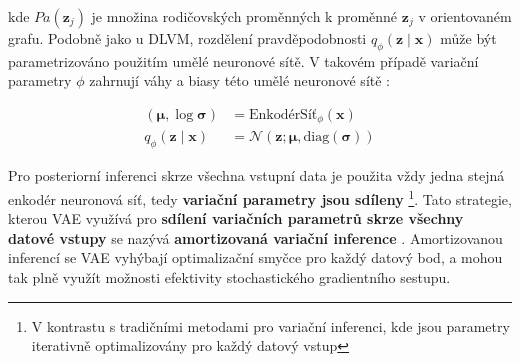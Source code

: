 kde $Pa(\textbf{z}_j)$ je množina rodičovských proměnných k proměnné $\textbf{z}_j$ v orientovaném grafu.
Podobně jako u DLVM, rozdělení pravděpodobnosti $q_\phi(\textbf{z}\mid\textbf{x})$ může být parametrizováno použitím umělé neuronové sítě.
V takovém případě variační parametry $\phi$ zahrnují váhy a biasy této umělé neuronové sítě \cite{Kingma2014}:


\begin{align}
    (\boldsymbol{\mu}, \log \boldsymbol{\sigma}) &= \text{EnkodérSíť}_\phi(\textbf{x}) \\
    q_\phi(\textbf{z}\mid\textbf{x}) &= \mathcal{N}(\textbf{z}; \boldsymbol{\mu}, \text{diag}(\boldsymbol{\sigma})) \label{eq:enkoder_diag}
\end{align}

Pro posteriorní inferenci skrze všechna vstupní data je použita vždy jedna stejná enkodér neuronová síť, tedy \textbf{variační parametry jsou sdíleny}
\footnote{V kontrastu s tradičními metodami pro variační inferenci, kde jsou parametry iterativně optimalizovány pro každý datový vstup}.
Tato strategie, kterou VAE využívá pro \textbf{sdílení variačních parametrů skrze všechny datové vstupy} se nazývá \textbf{amortizovaná variační inference} \cite{Gershman2014}.
Amortizovanou inferencí se VAE vyhýbají optimalizační smyčce pro každý datový bod, a mohou tak plně využít možnosti efektivity stochastického gradientního sestupu. \cite{Kingma2019}